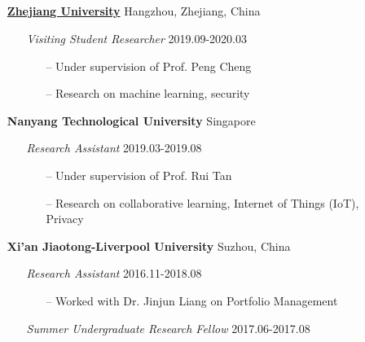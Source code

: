 \documentclass[11pt]{article}
\begin{document}
\subsection*{}
\begin{itemize}[leftmargin=0em]
    \setlength\itemsep{1em}
    \item[] \large\textbf{\href{}{Zhejiang University}} \hfill Hangzhou, Zhejiang, China
        \begin{itemize}[noitemsep, nolistsep, leftmargin=0em]
            \item[] \large\textit{Visiting Student Researcher} \hfill 2019.09-2020.03
             \begin{itemize}
                \item[--] Under supervision of Prof. Peng Cheng 
                \item[--] Research on machine learning, security
             \end{itemize}
        \end{itemize} 
    \item[] \large\textbf{Nanyang Technological University} \hfill Singapore
        \begin{itemize}[noitemsep, nolistsep, leftmargin=0em]
            \item[] \large\textit{Research Assistant} \hfill 2019.03-2019.08
             \begin{itemize}
                \item[--] Under supervision of Prof. Rui Tan
                \item[--] Research on collaborative learning, Internet of Things (IoT), Privacy
             \end{itemize}
        \end{itemize} 
    \item[] \large\textbf{Xi'an Jiaotong-Liverpool University} \hfill Suzhou, China
        \begin{itemize}[noitemsep, nolistsep, leftmargin=0em]
            \item[] \large\emph{Research Assistant} \hfill 2016.11-2018.08
             \begin{itemize}
                \item[--] Worked with Dr. Jinjun Liang on Portfolio Management
             \end{itemize}
            \item[] \large\emph{Summer Undergraduate Research Fellow} \hfill 2017.06-2017.08
             \begin{itemize}

\end{itemize}
\end{itemize}
\end{itemize}
\end{document}
